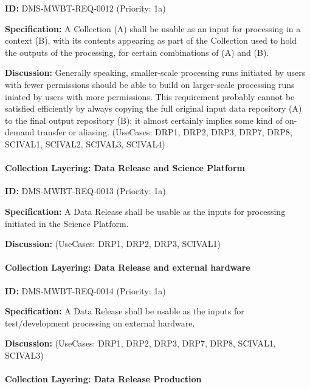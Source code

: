 \documentclass[SE,toc,lsstdraft]{lsstdoc}
\begin{document}
\label{DMS-MWBT-REQ-0012}
\textbf{ID:} DMS-MWBT-REQ-0012 (Priority: 1a)

\textbf{Specification:}
A Collection (A) shall be usable as an input for processing in a context (B), with its contents appearing as part of the Collection used to hold the outputs of the processing, for certain combinations of (A) and (B).

\textbf{Discussion:}
Generally speaking, smaller-scale processing runs initiated by users with fewer permissions should be able to build on larger-scale processing runs iniated by users with more permissions. This requirement probably cannot be satisfied efficiently by always copying the full original input data repository (A) to the final output repository (B); it almost certainly implies some kind of on-demand transfer or aliasing. (UseCases: DRP1, DRP2, DRP3, DRP7, DRP8, SCIVAL1, SCIVAL2, SCIVAL3, SCIVAL4)

\paragraph{Collection Layering: Data Release and Science Platform}\hfill  %

\label{DMS-MWBT-REQ-0013}
\textbf{ID:} DMS-MWBT-REQ-0013 (Priority: 1a)

\textbf{Specification:}
A Data Release shall be usable as the inputs for processing initiated in the Science Platform.

\textbf{Discussion:}
(UseCases: DRP1, DRP2, DRP3, SCIVAL1)

\paragraph{Collection Layering: Data Release and external hardware}\hfill  %

\label{DMS-MWBT-REQ-0014}
\textbf{ID:} DMS-MWBT-REQ-0014 (Priority: 1a)

\textbf{Specification:}
A Data Release shall be usable as the inputs for test/development processing on external hardware.

\textbf{Discussion:}
(UseCases: DRP1, DRP2, DRP3, DRP7, DRP8, SCIVAL1, SCIVAL3)

\paragraph{Collection Layering: Data Release Production}\hfill  %
\end{document}
